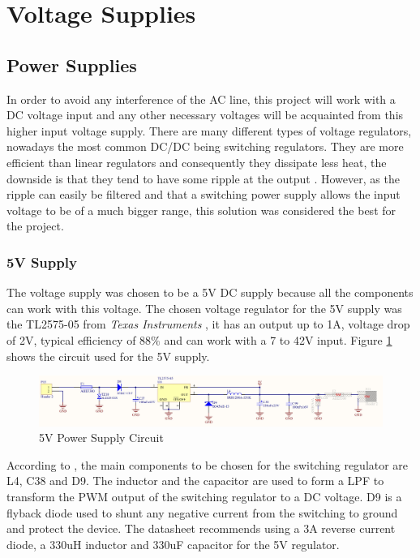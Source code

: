 \section{Voltage Supplies}\label{sec:voltage-supplies}

	\subsection{Power Supplies}\label{ssec:power-supplies}
		In order to avoid any interference of the AC line, this project will work with a DC voltage input and any other necessary voltages will be acquainted from this higher input voltage supply. There are many different types of voltage regulators, nowadays the most common DC/DC being switching regulators. They are more efficient than linear regulators and consequently they dissipate less heat, the downside is that they tend to have some ripple at the output \cite{schweber2017}. However, as the ripple can easily be filtered and that a switching power supply allows the input voltage to be of a much bigger range, this solution was considered the best for the project. 

		\subsubsection{5V Supply}\label{sssec:5v-supply}
			The voltage supply was chosen to be a 5V DC supply because all the components can work with this voltage. The chosen voltage regulator for the 5V supply was the TL2575-05 from \textit{Texas Instruments} \cite{tl2575-05-datasheet}, it has an output up to 1A, voltage drop of 2V, typical efficiency of 88$\%$ and can work with a 7 to 42V input. Figure \ref{fig:tl2575-05-circuit} shows the circuit used for the 5V supply.

			\begin{figure}[htbp]
				\centering
					\includegraphics[width=1\textwidth]{figuras/fig-tl2575-05-circuit.png}
				\caption{5V Power Supply Circuit}
				\label{fig:tl2575-05-circuit}
			\end{figure}

			According to \cite{tl2575-05-datasheet}, the main components to be chosen for the switching regulator are L4, C38 and D9. The inductor and the capacitor are used to form a LPF to transform the PWM output of the switching regulator to a DC voltage. D9 is a flyback diode used to shunt any negative current from the switching to ground and protect the device. The datasheet recommends using a 3A reverse current diode, a 330uH inductor and 330uF capacitor for the 5V regulator.

